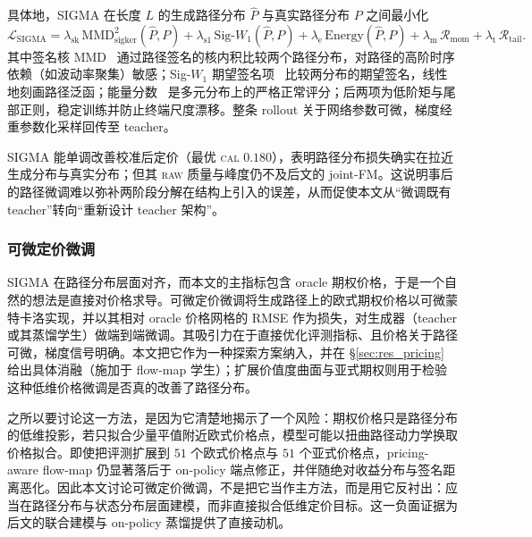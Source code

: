 \documentclass[11pt]{ctexart}
\newcommand{\raw}{\textsc{raw}}
\newcommand{\caltext}{\textsc{cal}}
\begin{document}
具体地，SIGMA 在长度 $L$ 的生成路径分布 $\hat P$ 与真实路径分布 $P$ 之间最小化
\begin{equation}
\mathcal L_{\mathrm{SIGMA}}
= \lambda_{\mathrm{sk}}\,\mathrm{MMD}^2_{\mathrm{sigker}}(\hat P,P)
+ \lambda_{\mathrm{s1}}\,\mathrm{Sig}\text{-}W_1(\hat P,P)
+ \lambda_{\mathrm{e}}\,\mathrm{Energy}(\hat P,P)
+ \lambda_{\mathrm{m}}\,\mathcal R_{\mathrm{mom}}
+ \lambda_{\mathrm{t}}\,\mathcal R_{\mathrm{tail}} .
\end{equation}
其中签名核 MMD~\citep{salvi2021signature,issa2023nonadversarial,gretton2012kernel} 通过路径签名的核内积比较两个路径分布，对路径的高阶时序依赖（如波动率聚集）敏感；Sig-$W_1$ 期望签名项~\citep{ni2021sigwgan,ni2020conditional} 比较两分布的期望签名，线性地刻画路径泛函；能量分数~\citep{pacchiardi2024probabilistic} 是多元分布上的严格正常评分；后两项为低阶矩与尾部正则，稳定训练并防止终端尺度漂移。整条 rollout 关于网络参数可微，梯度经重参数化采样回传至 teacher。

SIGMA 能单调改善校准后定价（最优 \caltext{} $0.180$），表明路径分布损失确实在拉近生成分布与真实分布；但其 \raw{} 质量与峰度仍不及后文的 joint-FM。这说明事后的路径微调难以弥补两阶段分解在结构上引入的误差，从而促使本文从“微调既有 teacher”转向“重新设计 teacher 架构”。

\subsubsection{可微定价微调}
\label{sec:diffprice}
SIGMA 在路径分布层面对齐，而本文的主指标包含 oracle 期权价格，于是一个自然的想法是直接对价格求导。可微定价微调将生成路径上的欧式期权价格以可微蒙特卡洛实现，并以其相对 oracle 价格网格的 RMSE 作为损失，对生成器（teacher 或其蒸馏学生）做端到端微调。其吸引力在于直接优化评测指标、且价格关于路径可微，梯度信号明确。本文把它作为一种探索方案纳入，并在 \S\ref{sec:res_pricing} 给出具体消融（施加于 flow-map 学生）；扩展价值度曲面与亚式期权则用于检验这种低维价格微调是否真的改善了路径分布。

之所以要讨论这一方法，是因为它清楚地揭示了一个风险：期权价格只是路径分布的低维投影，若只拟合少量平值附近欧式价格点，模型可能以扭曲路径动力学换取价格拟合。即使把评测扩展到 $51$ 个欧式价格点与 $51$ 个亚式价格点，pricing-aware flow-map 仍显著落后于 on-policy 端点修正，并伴随绝对收益分布与签名距离恶化。因此本文讨论可微定价微调，不是把它当作主方法，而是用它反衬出：应当在路径分布与状态分布层面建模，而非直接拟合低维定价目标。这一负面证据为后文的联合建模与 on-policy 蒸馏提供了直接动机。
\end{document}
